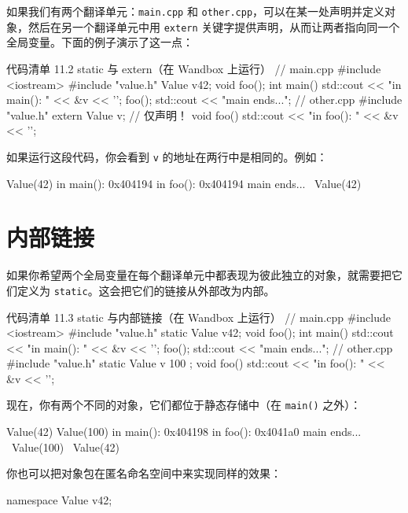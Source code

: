 如果我们有两个翻译单元：\texttt{main.cpp} 和 \texttt{other.cpp}，可以在某一处声明并定义对象，然后在另一个翻译单元中用 \texttt{extern} 关键字提供声明，从而让两者指向同一个全局变量。下面的例子演示了这一点：

\begin{codeboxt}[cpp]{代码清单 11.2 static 与 extern（在 Wandbox 上运行）}
// main.cpp
#include <iostream>
#include "value.h"
Value v{42};
void foo();
int main() {
std::cout << "in main(): " << &v << '\n';
foo();
std::cout << "main ends...\n";
}
// other.cpp
#include "value.h"
extern Value v; // 仅声明！
void foo() {
std::cout << "in foo(): " << &v << '\n';
}
\end{codeboxt}

如果运行这段代码，你会看到 \texttt{v} 的地址在两行中是相同的。例如：

\begin{codebox}[cpp]
Value(42)
in main(): 0x404194
in foo(): 0x404194
main ends...
~Value(42)
\end{codebox}

\section{内部链接}

如果你希望两个全局变量在每个翻译单元中都表现为彼此独立的对象，就需要把它们定义为 \texttt{static}。这会把它们的链接从外部改为内部。

\begin{codeboxt}[cpp]{代码清单 11.3 static 与内部链接（在 Wandbox 上运行）}
// main.cpp
#include <iostream>
#include "value.h"
static Value v{42};
void foo();
int main() {
std::cout << "in main(): " << &v << '\n';
foo();
std::cout << "main ends...\n";
}
// other.cpp
#include "value.h"
static Value v { 100 };
void foo() {
std::cout << "in foo(): " << &v << '\n';
}
\end{codeboxt}

现在，你有两个不同的对象，它们都位于静态存储中（在 \texttt{main()} 之外）：

\begin{codebox}[cpp]
Value(42)
Value(100)
in main(): 0x404198
in foo(): 0x4041a0
main ends...
~Value(100)
~Value(42)
\end{codebox}

你也可以把对象包在匿名命名空间中来实现同样的效果：

\begin{codebox}[cpp]
namespace {
Value v{42};
}
\end{codebox}

